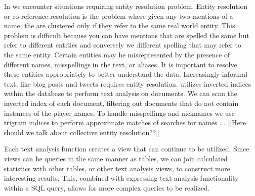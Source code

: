 In {\system} we encounter situations requiring entity resolution problem.
Entity resolution or co-reference resolution is the problem where given any two
mentions of a name, the are clustered only if they refer to the same real 
world entity. This problem is difficult because you can have mentions that are
spelled the same but refer to different entities and conversely we different
spelling that may refer to the same entity.
Certain entities may be misrepresented by the presence of different names, 
misspellings in the text, or aliases. It is important to
resolve these entities appropriately to better understand the data. Increasingly
informal text, like blog posts and tweets requires entity resolution. 
{\system} utilizes inverted indices within the database to perform text
analysis on documents. We can scan the inverted index of each 
document, filtering out documents that do not contain instances of the player names.
To handle misspellings and nicknames we use trigram indices to perform 
approximate matches of searches for names \cite{Jain:2009:BQO:1519103.1519108}.
.
[[Here should we talk about collective entity resolution??]]


Each text analysis function creates a view that can continue to be utilized.
Since views can be queries in the same manner as tables, we can join calculated
statistics with other tables, or other text analysis views, to construct more
interesting results. This, combined with expressing text analysis functionality
within a SQL query, allows for more complex queries to be realized. \\



